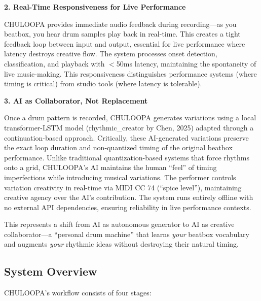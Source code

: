 \documentclass{aimc2026}
\begin{document}
\textbf{2. Real-Time Responsiveness for Live Performance}

CHULOOPA provides immediate audio feedback during recording---as you beatbox, you hear drum samples play back in real-time. This creates a tight feedback loop between input and output, essential for live performance where latency destroys creative flow. The system processes onset detection, classification, and playback with $<$50ms latency, maintaining the spontaneity of live music-making. This responsiveness distinguishes performance systems (where timing is critical) from studio tools (where latency is tolerable).

\textbf{3. AI as Collaborator, Not Replacement}

Once a drum pattern is recorded, CHULOOPA generates variations using a local transformer-LSTM model (rhythmic\_creator by Chen, 2025) adapted through a continuation-based approach. Critically, these AI-generated variations preserve the exact loop duration and non-quantized timing of the original beatbox performance. Unlike traditional quantization-based systems that force rhythms onto a grid, CHULOOPA's AI maintains the human ``feel'' of timing imperfections while introducing musical variations. The performer controls variation creativity in real-time via MIDI CC 74 (``spice level''), maintaining creative agency over the AI's contribution. The system runs entirely offline with no external API dependencies, ensuring reliability in live performance contexts.

This represents a shift from AI as autonomous generator to AI as creative collaborator---a ``personal drum machine'' that learns \emph{your} beatbox vocabulary and augments \emph{your} rhythmic ideas without destroying their natural timing.

\subsection{System Overview}

CHULOOPA's workflow consists of four stages:
\end{document}
